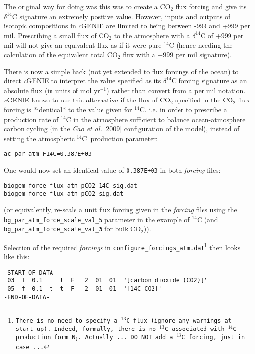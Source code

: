 \documentclass[11pt,fleqn]{book} %
\begin{document}
The original way for doing was this was to create a CO\(_{2}\) flux forcing and give its \(\delta^{14}\)C signature an extremely positive value. However, inputs and outputs of isotopic compositions in \textit{c}GENIE are limited to being between -999 and +999 per mil. Prescribing a small flux of CO\(_{2}\) to the atmosphere with a \(\delta^{14}\)C of +999 per mil will not give an equivalent flux as if it were pure \(^{14}\)C (hence needing the calculation of the equivalent total CO\(_{2}\) flux with a +999 per mil signature).

There is now a simple hack (not yet extended to flux forcings of the ocean) to direct \textit{c}GENIE to interpret the value specified as its \(\delta^{14}\)C forcing signature as an absolute flux (in units of mol yr\(^{-1}\)) rather than convert from a per mil notation. \textit{c}GENIE knows to use this alternative if the flux of CO\(_{2}\) specified in the CO\(_{2}\) flux forcing is *identical* to the value given for \(^{14}\)C. i.e. in order to prescribe a production rate of \(^{14}\)C in the atmosphere sufficient to balance ocean-atmosphere carbon cycling (in the \textit{Cao et al.} [2009] configuration of the model), instead of setting the atmospheric \(^{14}\)C\ production parameter:
\vspace{-2mm}\small\begin{verbatim}
ac_par_atm_F14C=0.387E+03 
\end{verbatim}\normalsize\vspace{-2mm}

\noindent One would now set an identical value of \texttt{0.387E+03} in both \textit{forcing} files:
\vspace{-2mm}\small\begin{verbatim}
biogem_force_flux_atm_pCO2_14C_sig.dat
biogem_force_flux_atm_pCO2_sig.dat
\end{verbatim}\normalsize\vspace{-2mm}
(or equivalently, re-scale a unit flux forcing given in the \textit{forcing} files using the \texttt{bg\_par\_atm\_force\_scale\_val\_5} parameter in the example of \(^{14}\)C (and \texttt{bg\_par\_atm\_force\_scale\_val\_3} for bulk CO\(_{2}\))).

\noindent Selection of the required \textit{forcings} in \texttt{configure\_forcings\_atm.dat\footnote{There is no need to specify a \(^{13}\)C flux (ignore any warnings at start-up). Indeed, formally, there is no \(^{13}\)C associated with \(^{14}\)C production form N\(_{2}\). Actually ... DO NOT add a \(^{13}\)C forcing, just in case ...}} then looks like this: 
\vspace{-2mm}\small\begin{verbatim}
-START-OF-DATA-
 03  f  0.1  t  t  F   2  01  01  '[carbon dioxide (CO2)]'
 05  f  0.1  t  t  F   2  01  01  '[14C CO2]'
-END-OF-DATA-
\end{verbatim}\normalsize\vspace{-2mm}
\end{document}

